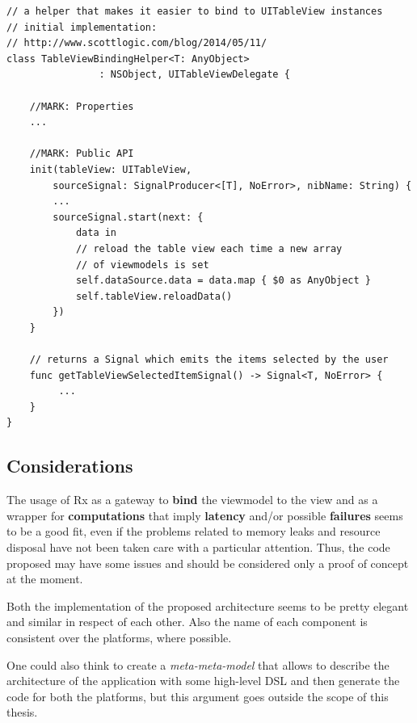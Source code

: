\begin{verbatim}
// a helper that makes it easier to bind to UITableView instances
// initial implementation: 
// http://www.scottlogic.com/blog/2014/05/11/
class TableViewBindingHelper<T: AnyObject> 
				: NSObject, UITableViewDelegate {

    //MARK: Properties
    ...

    //MARK: Public API
    init(tableView: UITableView,
        sourceSignal: SignalProducer<[T], NoError>, nibName: String) {
        ...
        sourceSignal.start(next: {
            data in
            // reload the table view each time a new array 
            // of viewmodels is set
            self.dataSource.data = data.map { $0 as AnyObject }
            self.tableView.reloadData()
        })
    }

    // returns a Signal which emits the items selected by the user
    func getTableViewSelectedItemSignal() -> Signal<T, NoError> {
         ...
    }
}
\end{verbatim}


\subsection{Considerations}\label{considerations}

The usage of Rx as a gateway to \textbf{bind} the viewmodel to the view
and as a wrapper for \textbf{computations} that imply \textbf{latency}
and/or possible \textbf{failures} seems to be a good fit, even if the
problems related to memory leaks and resource disposal have not been
taken care with a particular attention. Thus, the code proposed may have
some issues and should be considered only a proof of concept at the
moment.

Both the implementation of the proposed architecture seems to be pretty
elegant and similar in respect of each other. Also the name of each
component is consistent over the platforms, where possible.

One could also think to create a \emph{meta-meta-model} that allows to
describe the architecture of the application with some high-level DSL
and then generate the code for both the platforms, but this argument
goes outside the scope of this thesis.



